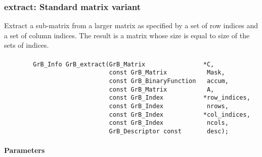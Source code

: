 
\subsubsection{{\sf extract}: Standard matrix variant}

Extract a sub-matrix from a larger matrix as specified by a set of row indices
and a set of column indices.  The result is a matrix whose size is equal to size of the sets of indices.

\paragraph{\syntax}

\begin{verbatim}                 
        GrB_Info GrB_extract(GrB_Matrix                *C,
                             const GrB_Matrix           Mask,
                             const GrB_BinaryFunction   accum,
                             const GrB_Matrix           A,
                             const GrB_Index           *row_indices,
                             const GrB_Index            nrows,
                             const GrB_Index           *col_indices,
                             const GrB_Index            ncols,
                             GrB_Descriptor const       desc);
\end{verbatim}

\paragraph{Parameters}

